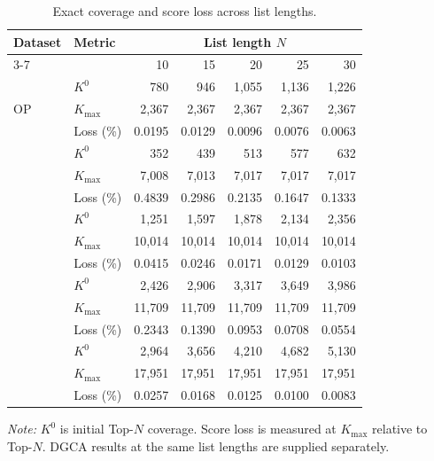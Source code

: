\begin{table}[t]
\centering
\caption{Exact coverage and score loss across list lengths.}
\label{tab:T03_exact_across_N}
\small
\setlength{\tabcolsep}{4pt}
\begin{tabular*}{\textwidth}{@{\extracolsep{\fill}}llrrrrr@{}}
\toprule
\multirow{2}{*}{Dataset} & \multirow{2}{*}{Metric} & \multicolumn{5}{c}{List length $N$} \\
\cmidrule(l){3-7}
 &  & 10 & 15 & 20 & 25 & 30 \\
\midrule
\multirow{3}{*}{OP} & $K^0$ & 780 & 946 & 1,055 & 1,136 & 1,226 \\
 & $K_{\max}$ & 2,367 & 2,367 & 2,367 & 2,367 & 2,367 \\
 & Loss (\%) & 0.0195 & 0.0129 & 0.0096 & 0.0076 & 0.0063 \\
\addlinespace[4pt]
\multirow{3}{*}{Yelp} & $K^0$ & 352 & 439 & 513 & 577 & 632 \\
 & $K_{\max}$ & 7,008 & 7,013 & 7,017 & 7,017 & 7,017 \\
 & Loss (\%) & 0.4839 & 0.2986 & 0.2135 & 0.1647 & 0.1333 \\
\addlinespace[4pt]
\multirow{3}{*}{VG} & $K^0$ & 1,251 & 1,597 & 1,878 & 2,134 & 2,356 \\
 & $K_{\max}$ & 10,014 & 10,014 & 10,014 & 10,014 & 10,014 \\
 & Loss (\%) & 0.0415 & 0.0246 & 0.0171 & 0.0129 & 0.0103 \\
\addlinespace[4pt]
\multirow{3}{*}{TG} & $K^0$ & 2,426 & 2,906 & 3,317 & 3,649 & 3,986 \\
 & $K_{\max}$ & 11,709 & 11,709 & 11,709 & 11,709 & 11,709 \\
 & Loss (\%) & 0.2343 & 0.1390 & 0.0953 & 0.0708 & 0.0554 \\
\addlinespace[4pt]
\multirow{3}{*}{SO} & $K^0$ & 2,964 & 3,656 & 4,210 & 4,682 & 5,130 \\
 & $K_{\max}$ & 17,951 & 17,951 & 17,951 & 17,951 & 17,951 \\
 & Loss (\%) & 0.0257 & 0.0168 & 0.0125 & 0.0100 & 0.0083 \\
\bottomrule
\end{tabular*}
\par\smallskip
\begin{minipage}{.98\textwidth}\footnotesize
\textit{Note:} $K^0$ is initial Top-$N$ coverage. Score loss is measured at $K_{\max}$ relative to Top-$N$. DGCA results at the same list lengths are supplied separately.
\end{minipage}
\end{table}

